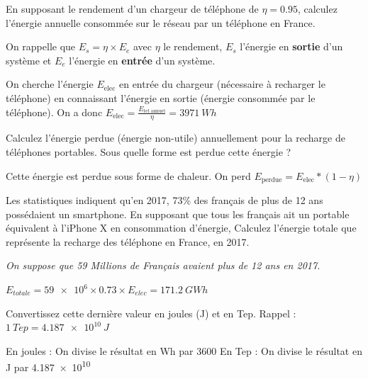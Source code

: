 \documentclass[10pt,fleqn]{article} %
\begin{document}
\begin{exercise}
\begin{question}
  En supposant le rendement d'un chargeur de téléphone de $\eta = 0.95$, calculez l'énergie annuelle consommée sur le réseau par un téléphone en France.

  On rappelle que $E_s = \eta \times E_e$ avec $\eta$ le rendement, $E_s$ l'énergie en \textbf{sortie} d'un système et $E_e$ l'énergie en \textbf{entrée} d'un système.
\end{question}
\begin{solution}
  On cherche l'énergie $E_{\text{elec}}$ en entrée du chargeur (nécessaire à recharger le téléphone) en connaissant l'énergie en sortie (énergie consommée par le téléphone). On a donc $ E_{\text{elec}} = \frac{E_{\text{tel annuel}}}{\eta} = \SI{3971}{Wh}$
\end{solution}

\begin{question}
Calculez l'énergie perdue (énergie non-utile) annuellement pour la recharge de téléphones portables. Sous quelle forme est perdue cette énergie ?
\end{question}
\begin{solution}
  Cette énergie est perdue sous forme de chaleur. On perd $E_{\text{perdue}} = E_{\text{elec}} * (1-\eta) $
\end{solution}

\begin{question}
  Les statistiques indiquent qu'en 2017, 73\% des français de plus de 12 ans possédaient un smartphone. En supposant que tous les français ait un portable équivalent à l'iPhone X en consommation d'énergie, Calculez l'énergie totale que représente la recharge des téléphone en France, en 2017.

  \textit{On suppose que 59 Millions de Français avaient plus de 12 ans en 2017. }
\end{question}
\begin{solution}
  $E_{totale} = \num{59e6}\times 0.73 \times E_{elec}  = \SI{171.2}{GWh}$
\end{solution}

\begin{question}
Convertissez cette dernière valeur en joules (J) et en Tep. Rappel : $\SI{1}{Tep} = \SI{4.187e10}{J}$
\end{question}

\begin{solution}
  En joules : On divise le résultat en Wh par 3600
  En Tep : On divise le résultat en J par \num{4.187e10}
\end{solution}
\end{exercise}
\end{document}
